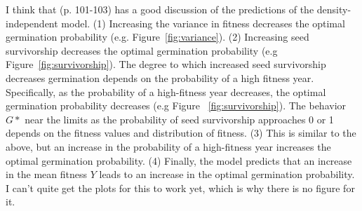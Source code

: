 \documentclass[12pt, oneside, titlepage]{article}   	%
\begin{document}
I think that \cite{ellner1985a} (p. 101-103) has a good discussion of the predictions of the density-independent model. (1) Increasing the variance in fitness decreases the optimal germination probability (e.g. Figure~\ref{fig:variance}). (2) Increasing seed survivorship decreases the optimal germination probability (e.g Figure~\ref{fig:survivorship}). The degree to which increased seed survivorship decreases germination depends on the probability of a high fitness year. Specifically, as the probability of a high-fitness year decreases, the optimal germination probability decreases (e.g Figure ~\ref{fig:survivorship}). The behavior $G*$ near the limits as the probability of seed survivorship approaches 0 or 1 depends on the fitness values and distribution of fitness. (3) This is similar to the above, but an increase in the probability of a high-fitness year increases the optimal germination probability. (4) Finally, the model predicts that an increase in the mean fitness $Y$ leads to an increase in the optimal germination probability. I can't quite get the plots for this to work yet, which is why there is no figure for it. 


\end{document}
